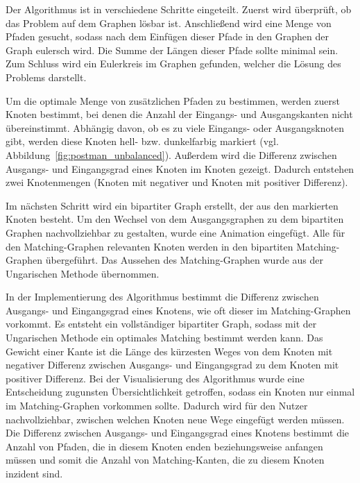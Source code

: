 Der Algorithmus ist in verschiedene Schritte eingeteilt. Zuerst wird überprüft, ob das Problem auf dem Graphen lösbar ist. Anschließend wird eine Menge von Pfaden gesucht, sodass nach dem Einfügen dieser Pfade in den Graphen der Graph eulersch wird. Die Summe der Längen dieser Pfade sollte minimal sein.
Zum Schluss wird ein Eulerkreis im Graphen gefunden, welcher die Lösung des Problems darstellt.

Um die optimale Menge von zusätzlichen Pfaden zu bestimmen, werden zuerst Knoten bestimmt, bei denen die Anzahl der Eingangs- und Ausgangskanten nicht übereinstimmt.
Abhängig davon, ob es zu viele Eingangs- oder Ausgangsknoten gibt, werden diese Knoten hell- bzw. dunkelfarbig markiert (vgl. Abbildung~\ref{fig:postman_unbalanced}). Außerdem wird die Differenz zwischen Ausgangs- und Eingangsgrad eines Knoten im Knoten gezeigt. Dadurch entstehen zwei Knotenmengen (Knoten mit negativer und Knoten mit positiver Differenz). 

Im nächsten Schritt wird ein bipartiter Graph erstellt, der aus den markierten Knoten besteht. Um den Wechsel von dem Ausgangsgraphen zu dem bipartiten Graphen nachvollziehbar zu gestalten, wurde eine Animation eingefügt. Alle für den Matching-Graphen relevanten Knoten werden in den bipartiten Matching-Graphen übergeführt. Das Aussehen des Matching-Graphen wurde aus der Ungarischen Methode übernommen. 

In der Implementierung des Algorithmus bestimmt die Differenz zwischen Ausgangs- und Eingangsgrad eines Knotens, wie oft dieser im Matching-Graphen vorkommt. Es entsteht ein vollständiger bipartiter Graph, sodass mit der Ungarischen Methode ein optimales Matching bestimmt werden kann. Das Gewicht einer Kante ist die Länge des kürzesten Weges von dem Knoten mit negativer Differenz zwischen Ausgangs- und Eingangsgrad zu dem Knoten mit positiver Differenz. Bei der Visualisierung des Algorithmus wurde eine Entscheidung zugunsten Übersichtlichkeit getroffen, sodass ein Knoten nur einmal im Matching-Graphen vorkommen sollte. Dadurch wird für den Nutzer nachvollziehbar, zwischen welchen Knoten neue Wege eingefügt werden müssen. Die Differenz zwischen Ausgangs- und Eingangsgrad eines Knotens bestimmt die Anzahl von Pfaden, die in diesem Knoten enden beziehungsweise anfangen müssen und somit die Anzahl von Matching-Kanten, die zu diesem Knoten inzident sind.

